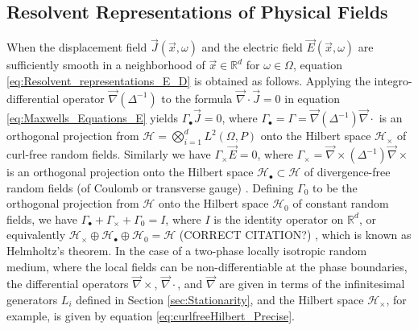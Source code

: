 \documentclass{cmslatex}
\begin{document}
\subsection{Resolvent Representations of Physical Fields}
\label{sec:Resolvent_Representations}
%
When the displacement field $\vec{J}(\vec{x},\omega)$ and the electric
field $\vec{E}(\vec{x},\omega)$ are sufficiently smooth in a neighborhood
of $\vec{x}\in\mathbb{R}^d$ for $\omega\in\Omega$, equation
\eqref{eq:Resolvent_representations_E_D} is obtained as
follows. Applying the integro-differential operator $\vec{\nabla}(\Delta^{-1})$
to the formula $\vec{\nabla}\cdot\vec{J}=0$ in equation 
\eqref{eq:Maxwells_Equations_E} yields $\Gamma_\bullet\vec{J}=0$, where
$\Gamma_\bullet=\Gamma=\vec{\nabla}(\Delta^{-1})\vec{\nabla}\cdot$ is an orthogonal projection
\cite{Golden:CMP-473,Murphy:JMP:063506} from
$\mathscr{H}=\bigotimes_{i=1}^dL^2(\Omega,P)$ onto the Hilbert space $\mathscr{H}_\times$
of curl-free random fields.
Similarly we have $\Gamma_\times\vec{E}=0$,   
where $\Gamma_\times=\vec{\nabla}\times(\Delta^{-1})\vec{\nabla}\times$ is an orthogonal 
projection onto the Hilbert space \cite{Golden:CMP-473}
$\mathscr{H}_{\bullet}\subset\mathscr{H}$ of divergence-free random fields (of
Coulomb or transverse gauge) \cite{Murphy:JMP:063506}. Defining $\Gamma_0$
to be the orthogonal projection from $\mathscr{H}$ onto the Hilbert
space $\mathscr{H}_0$ of constant random fields,
we have 
$\Gamma_\bullet+\Gamma_\times+\Gamma_0=I$, where $I$ is the identity operator on
$\mathbb{R}^d$, or equivalently
$\mathscr{H}_\times\oplus\mathscr{H}_\bullet\oplus\mathscr{H}_0=\mathscr{H}$ (CORRECT CITATION?)
\cite{MILTON:2002:TC}, which is known as Helmholtz's theorem. In the 
case of a two-phase locally isotropic random medium, where the local fields
can be non-differentiable at the phase boundaries, the differential
operators $\vec{\nabla}\times$, $\vec{\nabla}\cdot$, and $\vec{\nabla}$ are given
\cite{Golden:CMP-473} in terms of the infinitesimal generators $L_i$
defined in Section \ref{sec:Stationarity}, and the Hilbert space
$\mathscr{H}_\times$, for example, is given by equation
\eqref{eq:curlfreeHilbert_Precise}.
\end{document}
